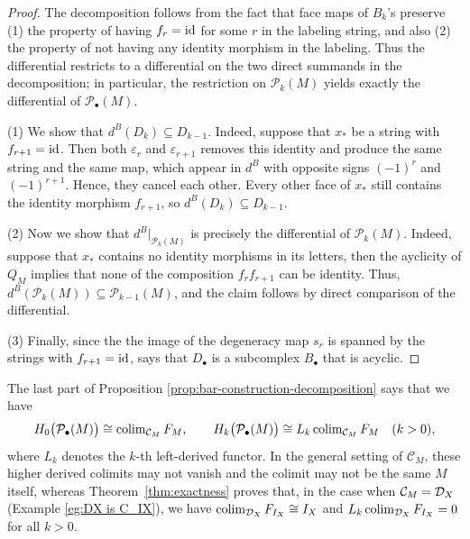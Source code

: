\documentclass[a4paper,leqno]{amsart}
\begin{document}
\begin{proof}
The decomposition follows from the fact that face maps of $B_k$'s preserve (1) the property of having $f_r=\operatorname{id}$ for some $r$ in the labeling string, and also (2) the property of not having any identity morphism in the labeling.
Thus the differential restricts to a differential on the two direct summands in the decomposition; in particular, the restriction on $\mathcal{P}_k(M)$ yields exactly the differential of $\mathcal{P}_\bullet(M)$.

(1) We show that $d^B(D_k)\subseteq D_{k-1}$.  Indeed, suppose that $x_\ast$ be a string with $f_{r+1}=\operatorname{id}$. Then both $\varepsilon_r$ and $\varepsilon_{r+1}$ removes this identity and produce the same string and the same map, which appear in $d^B$ with opposite signs $(-1)^r$ and $(-1)^{r+1}$.  Hence, they cancel each other.  Every other face of $x_\ast$ still contains the identity morphism $f_{r+1}$, so $d^B(D_k)\subseteq D_{k-1}$.

(2) Now we show that $d^B|_{\mathcal{P}_k(M)}$ is precisely the differential of $\mathcal{P}_k(M)$.  Indeed, suppose that $x_\ast$ contains no identity morphisms in its letters, then the ayclicity of $Q_M$ implies that none of the composition $f_rf_{r+1}$ can be identity.  Thus, $d^B(\mathcal{P}_k(M))\subseteq \mathcal{P}_{k-1}(M)$, and the claim follows by direct comparison of the differential.

(3) Finally, since the the image of the degeneracy map $s_r$ is spanned by the strings with $f_{r+1}=\operatorname{id}$, \cite[\S8.3]{Wei94} says that $D_\bullet$ is a subcomplex $B_\bullet$ that is acyclic.
\end{proof}


The last part of Proposition \ref{prop:bar-construction-decomposition} says that we have
\begin{equation*}
H_0\bigl(\mathcal P_\bullet(M)\bigr)
\cong\operatorname{colim}_{\mathcal C_M}F_M,
\qquad
H_k\bigl(\mathcal P_\bullet(M)\bigr)
\cong L_k\operatorname{colim}_{\mathcal C_M}F_M
\quad(k>0),
\end{equation*}
where $L_k$ denotes the $k$-th left-derived functor. In the general setting of $\mathcal{C}_M$, these higher derived colimits may not vanish and the colimit may not be the same $M$ itself, whereas Theorem~\ref{thm:exactness} proves that, in the case when $\mathcal{C}_M=\mathcal D_X$ (Example \ref{eg:DX is C_IX}), we have $\operatorname{colim}_{\mathcal D_X} F_{I_X} \cong I_X$ and $L_k\operatorname{colim}_{\mathcal D_X} F_{I_X}=0$ for all $k>0$.

\end{document}
